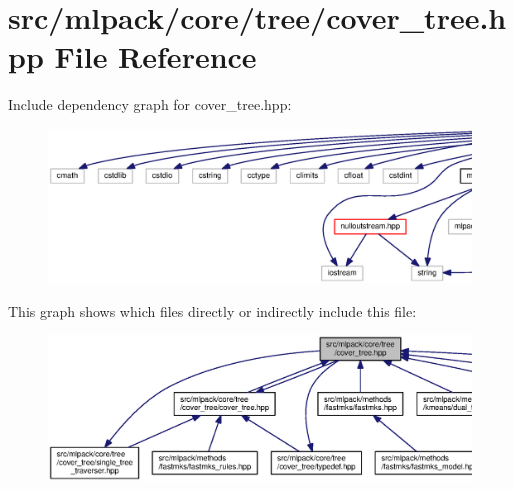 \section{src/mlpack/core/tree/cover\+\_\+tree.hpp File Reference}
\label{cover__tree_8hpp}
Include dependency graph for cover\+\_\+tree.\+hpp\+:
\nopagebreak
\begin{figure}[H]
\begin{center}
\leavevmode
\includegraphics[width=350pt]{cover__tree_8hpp__incl}
\end{center}
\end{figure}
This graph shows which files directly or indirectly include this file\+:
\nopagebreak
\begin{figure}[H]
\begin{center}
\leavevmode
\includegraphics[width=350pt]{cover__tree_8hpp__dep__incl}
\end{center}
\end{figure}

